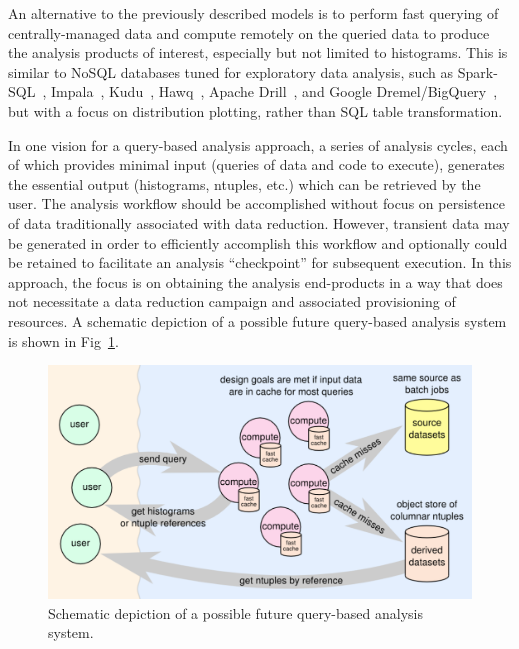\documentclass[12pt,a4paper]{article}
\begin{document}
An alternative to the previously described models is to perform fast querying of  centrally-managed data and compute remotely on the queried data to produce the analysis products of interest, especially but not limited to histograms. This is similar to NoSQL databases tuned for exploratory data analysis, such as Spark-SQL~\cite{Armbrust:2015:SSR:2723372.2742797}, Impala~\cite{bittorf2015impala}, Kudu~\cite{t.lipcond.alvesd.burkertj.d.cryansa.dembom.percys.rusd.wangm.bertozzic.p.mccabea.wang.2015}, Hawq~\cite{Chang:2014:HMP:2588555.2595636}, Apache Drill~\cite{drill}, and Google Dremel/BigQuery~\cite{36632}, but with a focus on distribution plotting, rather than SQL table transformation.

In one vision for a query-based analysis approach, a series of analysis cycles, each of which provides minimal input (queries of data and code to execute), generates the essential output (histograms, ntuples, etc.) which can be retrieved by the user. The analysis workflow should be accomplished without focus on persistence of data traditionally associated with data reduction. However, transient data may be generated in order to efficiently accomplish this workflow and optionally could be retained to facilitate an analysis ``checkpoint'' for subsequent execution. In this approach, the focus is on obtaining the analysis end-products in a way that does not necessitate a data reduction campaign and associated provisioning of resources. A schematic depiction of a possible future query-based analysis system is shown in Fig~\ref{fig:query_system}.

\begin{figure}
\begin{center}
\includegraphics[width=\textwidth]{query_based_analysis_system.png}
\caption{\label{fig:query_system}Schematic depiction of a possible future query-based analysis system.}
\end{center}
\end{figure}
\end{document}
